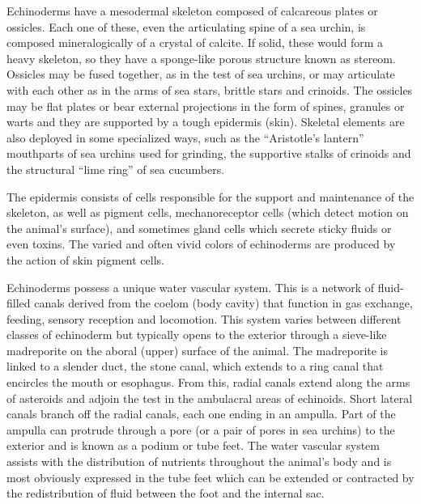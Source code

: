 \documentclass[]{book}
\theoremstyle{definition}
\theoremstyle{definition}
\theoremstyle{definition}
\theoremstyle{remark}
\begin{document}
Echinoderms have a mesodermal skeleton composed of calcareous plates or
ossicles. Each one of these, even the articulating spine of a sea
urchin, is composed mineralogically of a crystal of calcite. If solid,
these would form a heavy skeleton, so they have a sponge-like porous
structure known as stereom. Ossicles may be fused together, as in the
test of sea urchins, or may articulate with each other as in the arms of
sea stars, brittle stars and crinoids. The ossicles may be flat plates
or bear external projections in the form of spines, granules or warts
and they are supported by a tough epidermis (skin). Skeletal elements
are also deployed in some specialized ways, such as the ``Aristotle's
lantern'' mouthparts of sea urchins used for grinding, the supportive
stalks of crinoids and the structural ``lime ring'' of sea cucumbers.

The epidermis consists of cells responsible for the support and
maintenance of the skeleton, as well as pigment cells, mechanoreceptor
cells (which detect motion on the animal's surface), and sometimes gland
cells which secrete sticky fluids or even toxins. The varied and often
vivid colors of echinoderms are produced by the action of skin pigment
cells.

Echinoderms possess a unique water vascular system. This is a network of
fluid-filled canals derived from the coelom (body cavity) that function
in gas exchange, feeding, sensory reception and locomotion. This system
varies between different classes of echinoderm but typically opens to
the exterior through a sieve-like madreporite on the aboral (upper)
surface of the animal. The madreporite is linked to a slender duct, the
stone canal, which extends to a ring canal that encircles the mouth or
esophagus. From this, radial canals extend along the arms of asteroids
and adjoin the test in the ambulacral areas of echinoids. Short lateral
canals branch off the radial canals, each one ending in an ampulla. Part
of the ampulla can protrude through a pore (or a pair of pores in sea
urchins) to the exterior and is known as a podium or tube feet. The
water vascular system assists with the distribution of nutrients
throughout the animal's body and is most obviously expressed in the tube
feet which can be extended or contracted by the redistribution of fluid
between the foot and the internal sac.
\end{document}
